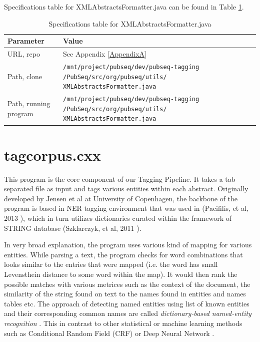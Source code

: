Specifications table for XMLAbstractsFormatter.java can be found in Table \ref{tab:XMLAbstractsFormatter}.

\begin{table}[htbp]
\caption{Specifications table for XMLAbstractsFormatter.java}
\centering
\begin{tabularx}{\textwidth}{ | l | X | }
  \hline
  Parameter & Value \\
  \hline
  URL, repo & See Appendix \ref{AppendixA} \\
  Path, clone & \texttt{/mnt/project/pubseq/dev/pubseq-tagging /PubSeq/src/org/pubseq/utils/ XMLAbstractsFormatter.java} \\
  Path, running program & \texttt{/mnt/project/pubseq/dev/pubseq-tagging /PubSeq/src/org/pubseq/utils/ XMLAbstractsFormatter.java} \\
  \hline
\end{tabularx}
\label{tab:XMLAbstractsFormatter}
\end{table}


\section{tagcorpus.cxx}

This program is the core component of our Tagging Pipeline. It takes a tab-separated file as input and tags various entities within each abstract. Originally developed by Jensen et al at University of Copenhagen, the backbone of the program is based in NER tagging environment that was used in (Pacifilis, et al, 2013 \citep{pafilis2013species}), which in turn utilizes dictionaries curated within the framework of STRING database (Szklarczyk, et al, 2011 \citep{szklarczyk2011string}).

In very broad explanation, the program uses various kind of mapping for various entities. While parsing a text, the program checks for word combinations that looks similar to the entries that were mapped (i.e. the word has small Levensthein distance \citep{levenshtein1966binary} to some word within the map). It would then rank the possible matches with various metrices such as the context of the document, the similarity of the string found on text to the names found in entities and names tables etc. The approach of detecting named entities using list of known entities and their corresponding common names are called \textit{dictionary-based named-entity recognition} \citep{nadeau2007survey}. This in contrast to other statistical or machine learning methods such as Conditional Random Field (CRF) \citep{lafferty2001conditional} or Deep Neural Network \citep{collobert2008unified}.

